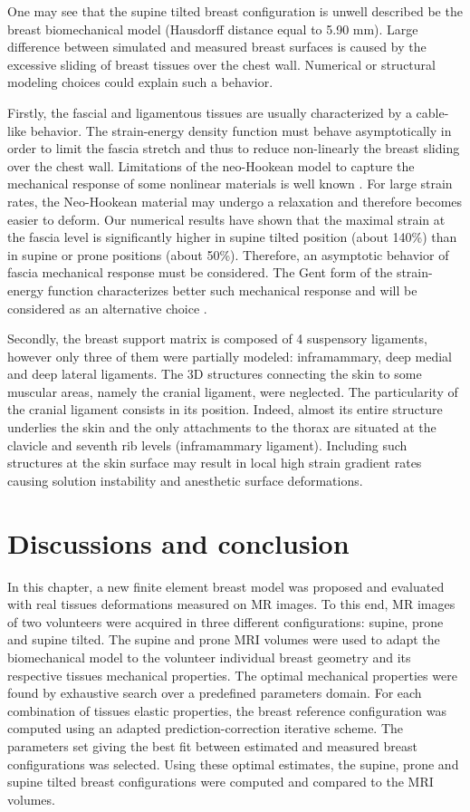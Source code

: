 One may see that the supine tilted breast configuration is unwell described be the breast biomechanical model (Hausdorff distance equal to 5.90 mm). Large difference between simulated and measured breast surfaces is caused by the excessive sliding of breast tissues over the chest wall. Numerical or structural modeling choices could explain such a behavior.

Firstly, the fascial and ligamentous tissues are usually characterized by a cable-like behavior. The strain-energy density function must behave asymptotically in order to limit the fascia stretch and thus to reduce non-linearly the breast sliding over the chest wall. Limitations of the neo-Hookean model to capture the mechanical response of some nonlinear materials is well known \citep{kaliske_finite_1997}. For large strain rates, the Neo-Hookean material may undergo a relaxation and therefore becomes easier to deform.  Our numerical results have shown that the maximal strain at the fascia level is significantly higher in supine tilted position (about 140\%) than in supine or prone positions (about 50\%).  Therefore, an asymptotic behavior of fascia mechanical response must be considered.  The Gent  form of the strain-energy function characterizes better such mechanical response \citep{gent_new_1996} and will be considered as an alternative choice .

Secondly, the breast support matrix is composed of 4 suspensory ligaments, however only three of them were partially modeled: inframammary, deep medial and deep lateral ligaments. The 3D structures connecting the skin to some muscular areas, namely the cranial ligament,  were neglected.  The particularity  of the cranial ligament consists in its position. Indeed,  almost its entire structure underlies the skin and the only attachments to the thorax are situated at the clavicle and seventh rib levels (inframammary ligament). Including such structures at the skin surface may result in local high strain gradient rates causing solution instability and anesthetic surface deformations. 


\section{Discussions and conclusion} \label{section:validation:discutionconclusion}

In this chapter, a new finite element breast model was proposed and  evaluated with real tissues deformations measured on MR images. To this end, MR images of two volunteers were acquired in three different configurations: supine, prone and supine tilted. The supine and prone MRI volumes were used to adapt the biomechanical model to the volunteer individual breast geometry and its respective tissues mechanical properties.  The optimal mechanical properties were found by exhaustive search over a predefined parameters domain. For each combination of tissues elastic properties,  the breast reference configuration was computed using an adapted prediction-correction iterative scheme. The parameters set giving the best fit between estimated and measured breast configurations was selected.  Using these optimal estimates, the supine, prone and supine tilted breast configurations were computed and compared to the MRI volumes.

